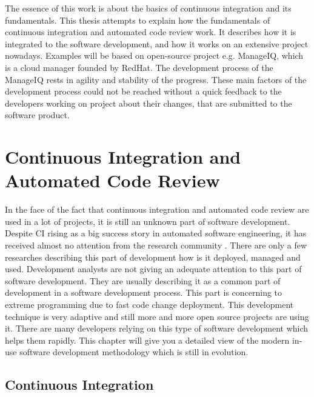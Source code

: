 The essence of this work is about the basics of continuous integration and its fundamentals. This thesis attempts to explain how the fundamentals of continuous integration and automated code review work. It describes how it is integrated to the software development, and how it works on an extensive project nowadays. Examples will be based on open-source project e.g. ManageIQ, which is a cloud manager founded by RedHat. The development process of the ManageIQ rests in agility and stability of the progress. These main factors of the development process could not be reached without a quick feedback to the developers working on project about their changes, that are submitted to the software product.

\chapter{Continuous Integration and Automated Code Review}

In the face of the fact that continuous integration and automated code review are used in a lot of projects, it is still an unknown part of software development. Despite CI rising as a big success story in automated software engineering, it has received almost no attention from the research community \cite{COPE}. There are only a few researches describing this part of development how is it deployed, managed and used. Development analysts are not giving an adequate attention to this part of software development. They are usually describing it as a common part of development in a software development process. This part is concerning to extreme programming due to fast code change deployment. This development technique is very adaptive and still more and more open source projects are using it. There are many developers relying on this type of software development which helps them rapidly. This chapter will give you a detailed view of the modern in-use software development methodology which is still in evolution.

\section{Continuous Integration}

